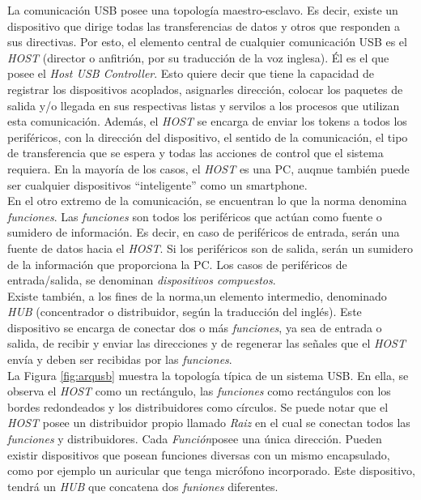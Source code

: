 	La comunicación USB posee una topología maestro-esclavo. Es decir, existe un dispositivo que dirige todas las transferencias de datos y otros que responden a sus directivas. Por esto, el elemento central de cualquier comunicación USB es el {\it HOST} (director o anfitrión, por su traducción de la voz inglesa). Él es el que posee el {\it Host USB Controller}\cite{USBspec}. Esto quiere decir que tiene la capacidad de registrar los dispositivos acoplados, asignarles dirección, colocar los paquetes de salida y/o llegada en sus respectivas listas y servilos a los procesos que utilizan esta comunicación. Además, el {\it HOST} se encarga de enviar los tokens a todos los periféricos, con la dirección del dispositivo, el sentido de la comunicación, el tipo de transferencia que se espera y todas las acciones de control que el sistema requiera. En la mayoría de los casos, el {\it HOST} es una PC, auqnue también puede ser cualquier dispositivos  ``inteligente'' como un smartphone.\\
	
	En el otro extremo de la comunicación, se encuentran lo que la norma denomina {\it funciones}\cite{USBspec}. Las {\it funciones} son todos los periféricos que actúan como fuente o sumidero de información. Es decir, en caso de periféricos de entrada, serán una fuente de datos hacia el {\it HOST}. Si los periféricos son de salida, serán un sumidero de la información que proporciona la PC. Los casos de periféricos de entrada/salida, se denominan {\it dispositivos compuestos}.\\
		
	Existe también, a los fines de la norma,un elemento intermedio, denominado {\it HUB} (concentrador o distribuidor, según la traducción del inglés). Este dispositivo se encarga de conectar dos o más {\it funciones}, ya sea de entrada o salida, de recibir y enviar las direcciones y de regenerar las señales que el {\it HOST} envía y deben ser recibidas por las {\it funciones}.\\
	
	La Figura \ref{fig:arqusb} muestra la topología típica de un sistema USB. En ella, se observa el {\it HOST} como un rectángulo, las {\it funciones} como rectángulos con los bordes redondeados y los distribuidores como círculos. Se puede notar que el {\it HOST} posee un distribuidor propio llamado {\it Raiz} en el cual se conectan todos las {\it funciones} y distribuidores. Cada {\it Función}posee una única dirección. Pueden existir dispositivos que posean funciones diversas con un mismo encapsulado, como por ejemplo un auricular que tenga micrófono incorporado. Este dispositivo, tendrá un {\it HUB} que concatena dos {\it funiones} diferentes.\\

